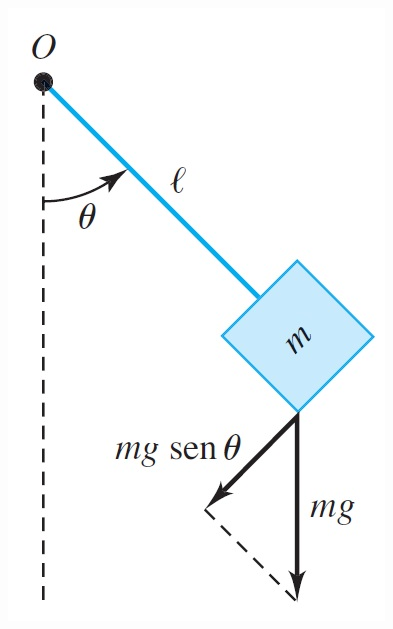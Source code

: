 \documentclass[12pt]{exam}
\begin{document}
    \includegraphics[scale=.5]{T5Extra.jpg}
    

    
    


 
 
\end{document}
